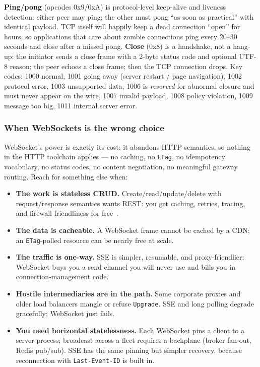 \textbf{Ping/pong} (opcodes 0x9/0xA) is protocol-level keep-alive and
liveness detection: either peer may ping; the other must pong ``as soon as
practical'' with identical payload. TCP itself will happily keep a dead
connection ``open'' for hours, so applications that care about zombie
connections ping every 20--30 seconds and close after a missed pong.
\textbf{Close} (0x8) is a handshake, not a hang-up: the initiator sends a
close frame with a 2-byte status code and optional UTF-8 reason; the peer
echoes a close frame; then the TCP connection drops. Key codes: 1000 normal,
1001 going away (server restart / page navigation), 1002 protocol error,
1003 unsupported data, 1006 is \emph{reserved} for abnormal closure and must
never appear on the wire, 1007 invalid payload, 1008 policy violation, 1009
message too big, 1011 internal server error.

\subsubsection{When WebSockets is the wrong choice}

WebSocket's power is exactly its cost: it abandons HTTP semantics, so nothing
in the HTTP toolchain applies --- no caching, no \texttt{ETag}, no
idempotency vocabulary, no status codes, no content negotiation, no
meaningful gateway routing. Reach for something else when:

\begin{itemize}
  \item \textbf{The work is stateless CRUD.} Create/read/update/delete with
        request/response semantics wants REST: you get caching, retries,
        tracing, and firewall friendliness for free~\cite{rfc9110}.
  \item \textbf{The data is cacheable.} A WebSocket frame cannot be cached by
        a CDN; an \texttt{ETag}-polled resource can be nearly free at scale.
  \item \textbf{The traffic is one-way.} SSE is simpler, resumable, and
        proxy-friendlier; WebSocket buys you a send channel you will never
        use and bills you in connection-management code.
  \item \textbf{Hostile intermediaries are in the path.} Some corporate
        proxies and older load balancers mangle or refuse \texttt{Upgrade}.
        SSE and long polling degrade gracefully; WebSocket just fails.
  \item \textbf{You need horizontal statelessness.} Each WebSocket pins a
        client to a server process; broadcast across a fleet requires a
        backplane (broker fan-out, Redis pub/sub). SSE has the same pinning
        but simpler recovery, because reconnection with
        \texttt{Last-Event-ID} is built in.
\end{itemize}

